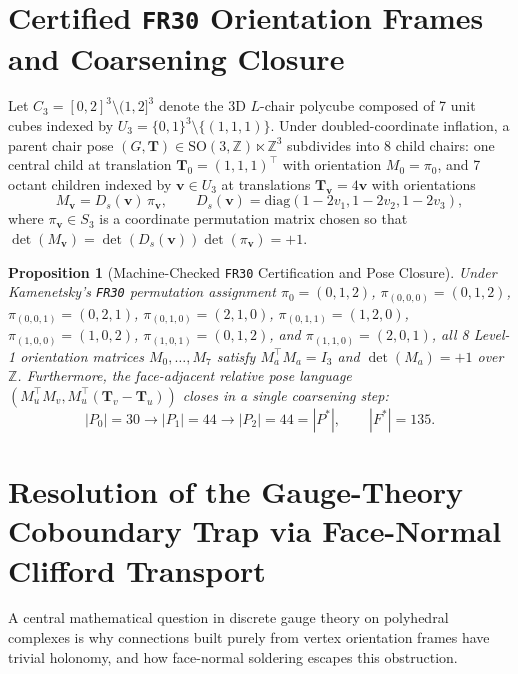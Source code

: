 \documentclass[11pt,a4paper]{article}
\newtheorem{proposition}[theorem]{Proposition}
\theoremstyle{definition}
\begin{document}
\section{Certified \texttt{FR30} Orientation Frames and Coarsening Closure}

Let $C_3 = [0,2]^3 \setminus (1,2]^3$ denote the 3D $L$-chair polycube composed of 7 unit cubes indexed by $U_3 = \{0,1\}^3 \setminus \{(1,1,1)\}$. Under doubled-coordinate inflation, a parent chair pose $(G, \mathbf{T}) \in \mathrm{SO}(3,\mathbb{Z}) \ltimes \mathbb{Z}^3$ subdivides into 8 child chairs: one central child at translation $\mathbf{T}_0 = (1,1,1)^\top$ with orientation $M_0 = \pi_0$, and 7 octant children indexed by $\mathbf{v} \in U_3$ at translations $\mathbf{T}_{\mathbf{v}} = 4\mathbf{v}$ with orientations
\begin{equation}
M_{\mathbf{v}} = D_s(\mathbf{v})\,\pi_{\mathbf{v}}, \qquad D_s(\mathbf{v}) = \mathrm{diag}(1-2v_1, 1-2v_2, 1-2v_3),
\end{equation}
where $\pi_{\mathbf{v}} \in S_3$ is a coordinate permutation matrix chosen so that $\det(M_{\mathbf{v}}) = \det(D_s(\mathbf{v}))\det(\pi_{\mathbf{v}}) = +1$.

\begin{proposition}[Machine-Checked \texttt{FR30} Certification and Pose Closure]
Under Kamenetsky's \texttt{FR30} permutation assignment $\pi_0 = (0,1,2)$, $\pi_{(0,0,0)}=(0,1,2)$, $\pi_{(0,0,1)}=(0,2,1)$, $\pi_{(0,1,0)}=(2,1,0)$, $\pi_{(0,1,1)}=(1,2,0)$, $\pi_{(1,0,0)}=(1,0,2)$, $\pi_{(1,0,1)}=(0,1,2)$, and $\pi_{(1,1,0)}=(2,0,1)$, all 8 Level-1 orientation matrices $M_0,\dots,M_7$ satisfy $M_a^\top M_a = I_3$ and $\det(M_a) = +1$ over $\mathbb{Z}$. Furthermore, the face-adjacent relative pose language $(M_u^\top M_v, M_u^\top(\mathbf{T}_v - \mathbf{T}_u))$ closes in a single coarsening step:
\begin{equation}
|P_0| = 30 \longrightarrow |P_1| = 44 \longrightarrow |P_2| = 44 = |P^*|, \qquad |F^*| = 135.
\end{equation}
\end{proposition}

\section{Resolution of the Gauge-Theory Coboundary Trap via Face-Normal Clifford Transport}

A central mathematical question in discrete gauge theory on polyhedral complexes is why connections built purely from vertex orientation frames have trivial holonomy, and how face-normal soldering escapes this obstruction.
\end{document}
